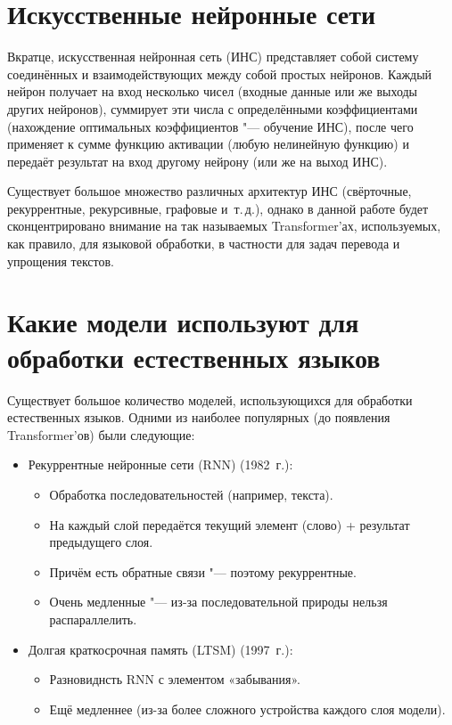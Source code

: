 \section{Искусственные нейронные сети}


Вкратце, искусственная нейронная сеть (ИНС) представляет собой систему соединённых и взаимодействующих между собой простых нейронов. Каждый нейрон получает на вход несколько чисел (входные данные или же выходы других нейронов), суммирует эти числа с определёнными коэффициентами (нахождение оптимальных коэффициентов "--- обучение ИНС), после чего применяет к сумме функцию активации (любую нелинейную функцию) и передаёт результат на вход другому нейрону (или же на выход ИНС).

Существует большое множество различных архитектур ИНС (свёрточные, рекуррентные, рекурсивные, графовые и~т.\,д.), однако в данной работе будет сконцентрировано внимание на так называемых Transformer'ах, используемых, как правило, для языковой обработки, в частности для задач перевода и упрощения текстов.


\section{Какие модели используют для обработки естественных языков}


Существует большое количество моделей, использующихся для обработки естественных языков. Одними из наиболее популярных (до появления Transformer'ов) были следующие:
\begin{itemize}%
  \item Рекуррентные нейронные сети (RNN) (1982~г.):
    \begin{itemize}%
       \item Обработка последовательностей (например, текста).
       \item На каждый слой передаётся текущий элемент (слово) + результат предыдущего слоя.
       \item Причём есть обратные связи "--- поэтому рекуррентные.
       \item Очень медленные "--- из-за последовательной природы нельзя распараллелить.
     \end{itemize} 
  \item Долгая краткосрочная память (LTSM) (1997~г.):
    \begin{itemize}%
      \item Разновиднсть RNN с элементом «забывания».
      \item Ещё медленнее (из-за более сложного устройства каждого слоя модели).
    \end{itemize}
\end{itemize}

